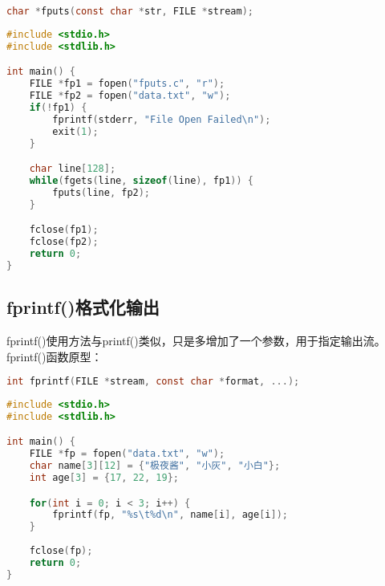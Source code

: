 \begin{lstlisting}[language=C]
char *fputs(const char *str, FILE *stream);
\end{lstlisting}

\vspace{0.5cm}


\begin{lstlisting}[language=C, title=fputs.c]
#include <stdio.h>
#include <stdlib.h>

int main() {
    FILE *fp1 = fopen("fputs.c", "r");
    FILE *fp2 = fopen("data.txt", "w");
    if(!fp1) {
        fprintf(stderr, "File Open Failed\n");
        exit(1);
    }

    char line[128];
    while(fgets(line, sizeof(line), fp1)) {
        fputs(line, fp2);
    }

    fclose(fp1);
    fclose(fp2);
    return 0;
}
\end{lstlisting}

\vspace{0.5cm}

\subsection{fprintf()格式化输出}

fprintf()使用方法与printf()类似，只是多增加了一个参数，用于指定输出流。\\

fprintf()函数原型：

\vspace{-0.5cm}

\begin{lstlisting}[language=C]
int fprintf(FILE *stream, const char *format, ...);
\end{lstlisting}

\vspace{0.5cm}


\begin{lstlisting}[language=C, title=fprintf.c]
#include <stdio.h>
#include <stdlib.h>

int main() {
    FILE *fp = fopen("data.txt", "w");
    char name[3][12] = {"极夜酱", "小灰", "小白"};
    int age[3] = {17, 22, 19};

    for(int i = 0; i < 3; i++) {
        fprintf(fp, "%s\t%d\n", name[i], age[i]);
    }
    
    fclose(fp);
    return 0;
}
\end{lstlisting}

